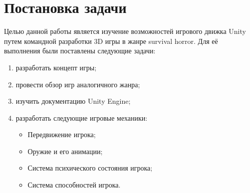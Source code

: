 
\section{Постановка задачи}
\label{sec:task}
Целью данной работы является изучение возможностей игрового движка Unity путем командной разработки 3D игры в жанре survival horror. Для её выполнения были поставлены следующие задачи:

 \begin{enumerate}
 \item  разработать концепт игры;
 \item  провести обзор игр аналогичного жанра;
 \item  изучить документацию Unity Engine;
 \item  разработать следующие игровые механики:
   \begin{itemize}
   \item  Передвижение игрока;
   \item  Оружие и его анимации;
   \item  Система психического состояния игрока;
   \item  Система способностей игрока.
   \end{itemize}
 \end{enumerate}
